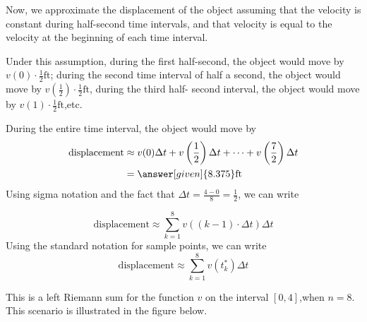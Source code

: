 \documentclass{ximera}
\begin{document}
\begin{example}
\begin{explanation}
\begin{image}
\end{image}
Now, we approximate the displacement of the object assuming that the velocity is constant during half-second time intervals, and that velocity is equal to the velocity at the beginning of each time interval.


 Under this assumption,  during the first half-second, the object would move by $v(0)\cdot\frac{1}{2} \mathrm{ft}$;  during the second time interval of half a  second, the object would move by $v\left(\frac{1}{2}\right)\cdot\frac{1}{2} \mathrm{ft}$, during the third half- second interval, the object would move by $v(1)\cdot\frac{1}{2} \mathrm{ft}$,etc. 
 
 
 During the entire time interval, the object would move by
\begin{align*}
   \text{displacement} &\approx v(0)\Delta t+v\left(\frac{1}{2}\right)\Delta t+ \cdots +v\left(\frac{7}{2}\right)\Delta t\\
   &=\answer[given]{8.375} \mathrm{ft} 
\end{align*}
Using sigma notation and the fact that $\Delta t=\frac{4-0}{8}=\frac{1}{2}$, we can write

  \[
   \text{displacement}\approx \sum_{k=1}^8v((k-1)\cdot\Delta t)\Delta t
\]
Using the standard notation for sample points, we can write
 \[
   \text{displacement}\approx \sum_{k=1}^8v(t_{k}^*)\Delta t
  \]

  This is a left Riemann sum for the function $v$ on the interval $[0,4]$,when $n=8$.
This scenario is illustrated in the figure below.


\end{explanation}
\end{example}
\end{document}
